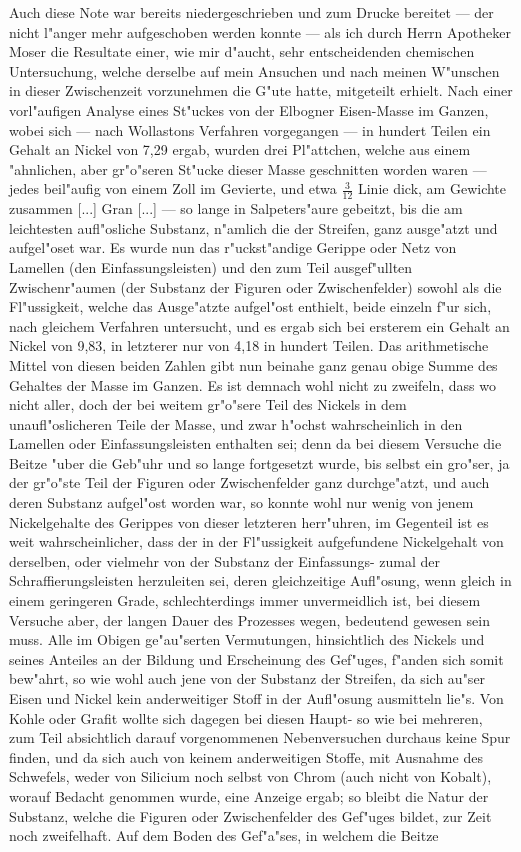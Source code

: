 \documentclass[a4paper, 11pt, oneside, german]{article}
\begin{document}
{Auch diese Note war bereits niedergeschrieben und zum Drucke bereitet --- der nicht l"anger mehr aufgeschoben werden konnte --- als ich durch Herrn Apotheker Moser die Resultate einer, wie mir d"aucht, sehr entscheidenden chemischen Untersuchung, welche derselbe auf mein Ansuchen und nach meinen W"unschen in dieser Zwischenzeit vorzunehmen die G"ute hatte, mitgeteilt erhielt. Nach einer vorl"aufigen Analyse eines St"uckes von der Elbogner Eisen-Masse im Ganzen, wobei sich --- nach Wollastons Verfahren vorgegangen --- in hundert Teilen ein Gehalt an Nickel von 7,29 ergab, wurden drei Pl"attchen, welche aus einem "ahnlichen, aber gr"o"seren St"ucke dieser Masse geschnitten worden waren --- jedes beil"aufig von einem Zoll im Gevierte, und etwa $\frac{3}{12}$ Linie dick, am Gewichte zusammen [...] Gran [...] --- so lange in Salpeters"aure gebeitzt, bis die am leichtesten aufl"osliche Substanz, n"amlich die der Streifen, ganz ausge"atzt und aufgel"oset war. Es wurde nun das r"uckst"andige Gerippe oder Netz von Lamellen (den Einfassungsleisten) und den zum Teil ausgef"ullten Zwischenr"aumen (der Substanz der Figuren oder Zwischenfelder) sowohl als die Fl"ussigkeit, welche das Ausge"atzte aufgel"ost enthielt, beide einzeln f"ur sich, nach gleichem Verfahren untersucht, und es ergab sich bei ersterem ein Gehalt an Nickel von 9,83, in letzterer nur von 4,18 in hundert Teilen. Das arithmetische Mittel von diesen beiden Zahlen gibt nun beinahe ganz genau obige Summe des Gehaltes der Masse im Ganzen. Es ist demnach wohl nicht zu zweifeln, dass wo nicht aller, doch der bei weitem gr"o"sere Teil des Nickels in dem unaufl"oslicheren Teile der Masse, und zwar h"ochst wahrscheinlich in den Lamellen oder Einfassungsleisten enthalten sei; denn da bei diesem Versuche die Beitze "uber die Geb"uhr und so lange fortgesetzt wurde, bis selbst ein gro"ser, ja der gr"o"ste Teil der Figuren oder Zwischenfelder ganz durchge"atzt, und auch deren Substanz aufgel"ost worden war, so konnte wohl nur wenig von jenem Nickelgehalte des Gerippes von dieser letzteren herr"uhren, im Gegenteil ist es weit wahrscheinlicher, dass der in der Fl"ussigkeit aufgefundene Nickelgehalt von derselben, oder vielmehr von der Substanz der Einfassungs- zumal der Schraffierungsleisten herzuleiten sei, deren gleichzeitige Aufl"osung, wenn gleich in einem geringeren Grade, schlechterdings immer unvermeidlich ist, bei diesem Versuche aber, der langen Dauer des Prozesses wegen, bedeutend gewesen sein muss. Alle im Obigen ge"au"serten Vermutungen, hinsichtlich des Nickels und seines Anteiles an der Bildung und Erscheinung des Gef"uges, f"anden sich somit bew"ahrt, so wie wohl auch jene von der Substanz der Streifen, da sich au"ser Eisen und Nickel kein anderweitiger Stoff in der Aufl"osung ausmitteln lie"s. Von Kohle oder Grafit wollte sich dagegen bei diesen Haupt- so wie bei mehreren, zum Teil absichtlich darauf vorgenommenen Nebenversuchen durchaus keine Spur finden, und da sich auch von keinem anderweitigen Stoffe, mit Ausnahme des Schwefels, weder von Silicium noch selbst von Chrom (auch nicht von Kobalt), worauf Bedacht genommen wurde, eine Anzeige ergab; so bleibt die Natur der Substanz, welche die Figuren oder Zwischenfelder des Gef"uges bildet, zur Zeit noch zweifelhaft. Auf dem Boden des Gef"a"ses, in welchem die Beitze }
\end{document}
